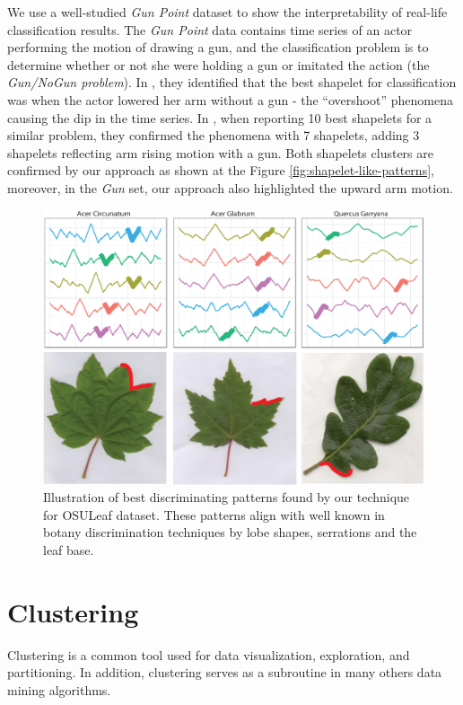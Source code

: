 \documentclass{llncs}
\begin{document}
We use a well-studied \textit{Gun Point} dataset to show the interpretability of real-life
classification results. The \textit{Gun Point} data contains time series of an actor performing the
motion of drawing a gun, and the classification problem is to determine whether or not she were
holding a gun or imitated the action (the \textit{Gun/NoGun problem}). In \cite{shapelet}, they
identified that the best shapelet for classification was when the actor lowered her arm without a
gun - the ``overshoot'' phenomena causing the dip in the time series. In \cite{bagnal}, when
reporting 10 best shapelets for a similar problem, they confirmed the phenomena with 7 shapelets,
adding 3 shapelets reflecting arm rising motion with a gun. Both shapelets clusters are confirmed by
our approach as shown at the Figure \ref{fig:shapelet-like-patterns}, moreover, in the \textit{Gun}
set, our approach also highlighted the upward arm motion.
\begin{figure}[tbp]
   \centering
   \includegraphics[width=130mm]{figures/AcerCircunatum.eps}
   \caption{Illustration of best discriminating patterns found by our technique for OSULeaf
dataset. These patterns align with well known in botany discrimination techniques by lobe
shapes, serrations and the leaf base.}
   \label{fig:shapelet-acer-patterns}
\end{figure}

\section{Clustering}
Clustering is a common tool used for data visualization, exploration, and partitioning. 
In addition, clustering serves as a subroutine in many others data mining algorithms.
\end{document}
